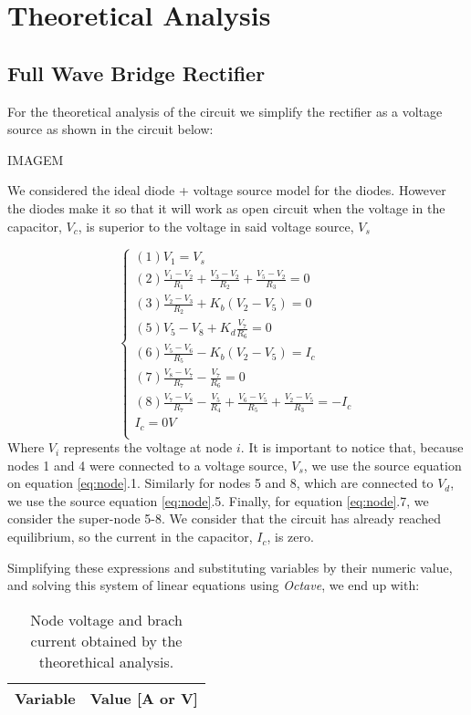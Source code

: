 \section{Theoretical Analysis}
\label{sec:analysis}

\subsection{Full Wave Bridge Rectifier}
For the theoretical analysis of the circuit we simplify the rectifier as a voltage source as shown in the circuit below:

IMAGEM

We considered the ideal diode + voltage source model for the diodes.
However the diodes make it so that it will work as open circuit when the voltage in the capacitor, $V_c$, is superior to the voltage in said voltage source, $V_s$

\begin{equation}\label{eq:node}
  \begin{cases}
    (1) V_1 = V_s \\
    (2) \frac{V_1 - V_2}{R_1} + \frac{V_3 - V_2}{R_2} + \frac{V_5 - V_2}{R_3} = 0 \\
    (3) \frac{V_2 - V_3}{R_2} + K_b(V_2 - V_5) = 0 \\
    (5) V_5 - V_8 + K_d\frac{V_7}{R_6} = 0 \\
    (6) \frac{V_5 - V_6}{R_5} - K_b(V_2-V_5) = I_c \\
    (7) \frac{V_8 - V_7}{R_7} - \frac{V_7}{R_6} = 0 \\
    (8) \frac{V_7 - V_8}{R_7} - \frac{V_5}{R_4} + \frac{V_6 - V_5}{R_5} + \frac{V_2 - V_5}{R_3} = -I_c \\
    I_c = 0V \\
  \end{cases}
\end{equation}
Where $V_i$ represents the voltage at node $i$. It is important to notice that, because nodes 1 and 4 were connected to a voltage source, $V_s$, we use the source equation on equation \ref{eq:node}.1. Similarly for nodes 5 and 8, which are connected to $V_d$, we use the source equation \ref{eq:node}.5. Finally, for equation \ref{eq:node}.7, we consider the super-node 5-8. We consider that the circuit has already reached equilibrium, so the current in the capacitor, $I_c$, is zero.
\par
Simplifying these expressions and substituting variables by their numeric value, and solving this system of linear equations using \textit{Octave}, we end up with:
\begin{table}[H]
  \centering
  \begin{tabular}{|l|r|}
    \hline    
    {\bf Variable} & {\bf Value [A or V]} \\ \hline
    
  \end{tabular}
  \caption{Node voltage and brach current obtained by the theorethical analysis.}
  \label{tab:node}
\end{table}
\par

